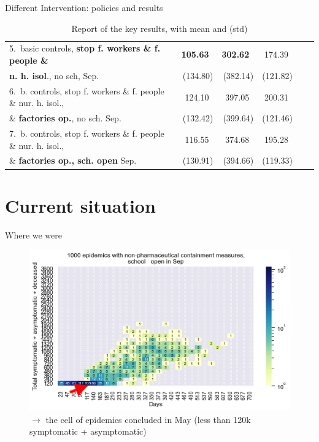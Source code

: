 \documentclass[8pt]{beamer}
\begin{document}
\begin{frame}{Different Intervention: policies and results}
\begin{table}[H]
\begin{tabular}{lrrrrr}
5.~basic controls, \textbf{stop f. workers \&  f. people \&}    & \textbf{{\color{orange}105.63}}~    &  \textbf{{\color{orange}302.62}}~      &  174.39~   \\
\textbf{ n. h. isol}., no sch, Sep.                                              &   (134.80)   &     (382.14)          &  (121.82) \\
 \midrule
6.~b. controls, stop f. workers \&  f. people \& nur. h. isol.,  &  124.10~    &    397.05~           &  200.31~    \\
\& \textbf{factories op.}, no sch. Sep.                                               &  (132.42)   &    (399.64)           &  (121.46) \\
\midrule
7.~b. controls, stop f. workers  \&  f. people \& nur. h. isol.,   &  116.55~   &    374.68~           &  195.28~    \\
 \& \textbf{factories op., sch. open} Sep.                                            &  (130.91) &     (394.66)           &  (119.33) \\
\bottomrule
\end{tabular}
\caption{Report of the key results, with mean and (std)}
\label{keyResultsT}
\end{table}



\end{frame}

\section{Current situation}

\begin{frame}{Where we were}

\begin{figure}[H]
\center
\includegraphics[scale=0.55]{WhereWeWere.png}

\caption{$\rightarrow$ the cell of epidemics concluded in May (less than 120k symptomatic + asymptomatic)} 
\label{WhereWeWere}
\end{figure}
\end{frame}
\end{document}
